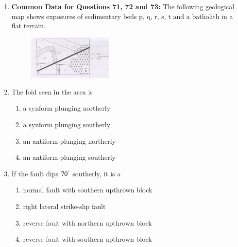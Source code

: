 \documentclass[journal,12pt,onecolumn]{IEEEtran}
\theoremstyle{remark}
\begin{document}
\begin{enumerate}
    \item[] \textbf{Common Data for Questions 71, 72 and 73:} The following geological map shows exposures of sedimentary beds p, q, r, s, t and a batholith  in a flat terrain.
    
    \begin{figure}[h!]
        \centering
        \includegraphics[width=0.4\textwidth]{figs/fig3.png}
        \caption{}
        \label{Fig.71-73}
    \end{figure}
    
    \item The fold seen in the area is 

    \hfill{}
    
    \begin{multicols}{2}
        \begin{enumerate}
            \item a synform plunging northerly
            \item a synform plunging southerly
            \item an antiform plunging northerly
            \item an antiform plunging southerly
        \end{enumerate}
    \end{multicols}

    \item If the fault dips $70^{\degree}$ southerly, it is a

    \hfill{}
    
    \begin{multicols}{2}
        \begin{enumerate}
            \item normal fault with southern upthrown block
            \item right lateral strike-slip fault
            \item reverse fault with northern upthrown block
            \item reverse fault with southern upthrown block
        \end{enumerate}
    \end{multicols}


\end{enumerate}
\end{document}
